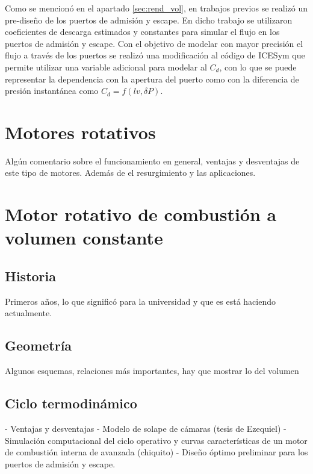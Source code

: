 Como se mencionó en el apartado \ref{sec:rend_vol}, en trabajos previos se
realizó un pre-diseño de los puertos de admisión y escape.
%
En dicho trabajo se utilizaron coeficientes de descarga estimados y constantes
para simular el flujo en los puertos de admisión y escape.
%
Con el objetivo de modelar con mayor precisión el flujo a través de los puertos
se realizó una modificación al código de ICESym que permite utilizar una
variable adicional para modelar al $C_d$, con lo que se puede representar la
dependencia con la apertura del puerto como con la diferencia de presión
instantánea como $C_d = f(lv, \delta P)$.


\section{Motores rotativos}
%
Algún comentario sobre el funcionamiento en general, ventajas y desventajas de
este tipo de motores.
%
Además de el resurgimiento y las aplicaciones.

\section{Motor rotativo de combustión a volumen constante}
%
\subsection{Historia}
%
Primeros años, lo que significó para la universidad y que es está haciendo
actualmente.

\subsection{Geometría}
%
Algunos esquemas, relaciones más importantes, hay que mostrar lo del volumen

\subsection{Ciclo termodinámico}
%
- Ventajas y desventajas - Modelo de solape de cámaras (tesis de Ezequiel) 
%
- Simulación computacional del ciclo operativo y curvas características de un
motor de combustión interna de avanzada (chiquito)
%
- Diseño óptimo preliminar para los puertos de admisión y escape.
